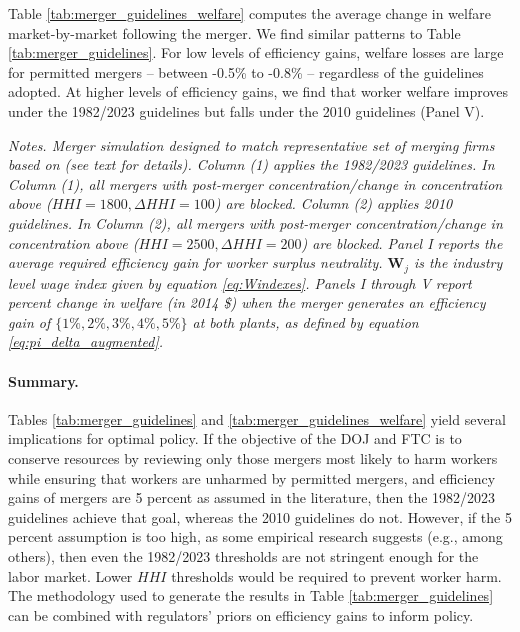 \documentclass[12pt]{article}
\theoremstyle{prop}
\begin{document}
Table \ref{tab:merger_guidelines_welfare} computes the average change in welfare market-by-market following the merger. 
We find similar patterns to Table \ref{tab:merger_guidelines}. 
For low levels of efficiency gains, welfare losses are large for permitted mergers -- between -0.5\% to -0.8\% -- regardless of the guidelines adopted. 
At higher levels of efficiency gains, we find that worker welfare improves under the 1982/2023 guidelines but falls under the 2010 guidelines (Panel V). 

\begin{table}[p!]
	\centering
	 
	\caption{Welfare applying the 1982/2023 and 2010 guidelines. \label{tab:merger_guidelines_welfare}}
	\begin{footnotesize}
		\begin{flushleft}
			\textit{Notes. Merger simulation designed to match representative set of merging firms based on \citet{Arnold} (see text for details). Column (1) applies the 1982/2023 guidelines.  In Column (1), all mergers with post-merger concentration/change in concentration above ($HHI=1800, \Delta HHI=100$) are blocked. Column (2)  applies 2010 guidelines.   In Column (2), all mergers with post-merger concentration/change in concentration above ($HHI=2500, \Delta HHI=200$) are blocked. Panel I  reports the average required efficiency gain for worker surplus neutrality. $\mathbf{W}_j$ is the industry level wage index given by equation \eqref{eq:Windexes}. Panels I through V report percent change in welfare (in 2014 \$)  when the merger generates an efficiency gain of $\{1\%,2\%,3\%,4\%,5\%\}$  at both plants, as defined by equation \eqref{eq:pi_delta_augmented}.  }   
		\end{flushleft}
	\end{footnotesize}
\end{table}

\paragraph{Summary.} Tables \ref{tab:merger_guidelines} and \ref{tab:merger_guidelines_welfare} yield several implications for optimal policy. 
If the objective of the DOJ and FTC is to conserve resources by reviewing only those mergers most likely to harm workers while ensuring that workers are unharmed by permitted mergers, and efficiency gains of mergers are 5 percent as assumed in the literature, then the 1982/2023 guidelines achieve that goal, whereas the 2010 guidelines do not. 
However, if the 5 percent assumption is too high, as some empirical research suggests (e.g., \citet{blonigen2016evidence} among others), then even the 1982/2023 thresholds are not stringent enough for the labor market. 
Lower $HHI$ thresholds would be required to prevent worker harm. 
The methodology used to generate the results in  Table \ref{tab:merger_guidelines} can be combined with regulators' priors on efficiency gains to inform policy.
  
\end{document}
